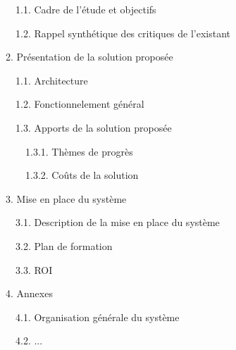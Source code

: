 \documentclass{mise_en_page}
\begin{document}
\ \ 1.1. Cadre de l’étude et objectifs

\ \ 1.2. Rappel synthétique des critiques de l’existant

2. Présentation de la solution proposée

\ \ 1.1. Architecture

\ \ 1.2. Fonctionnelement général

\ \ 1.3. Apports de la solution proposée

\ \ \ \ 1.3.1. Thèmes de progrès

\ \ \ \ 1.3.2. Coûts de la solution

3. Mise en place du système

\ \ 3.1. Description de la mise en place du système

\ \ 3.2. Plan de formation

\ \ 3.3. ROI

4. Annexes

\ \ 4.1. Organisation générale du système

\ \ 4.2. ...
\end{document}
